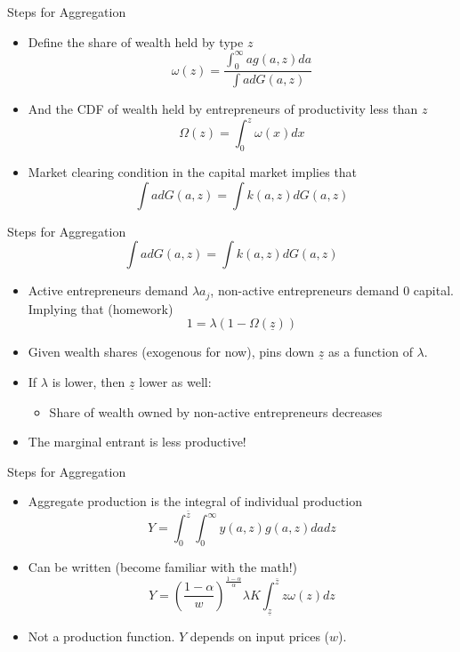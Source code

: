 \documentclass[11pt,aspectratio=169,xcolor={dvipsnames},hyperref={pdftex,pdfpagemode=UseNone,hidelinks,pdfdisplaydoctitle=true},usepdftitle=false]{beamer}
\begin{document}
\begin{frame}{Steps for Aggregation}
\begin{itemize}
\item Define the share of wealth held by type $z$
\[\omega(z) = \frac{ \int_0^{\infty} a g(a,z) da}{\int a dG(a,z)}\]
\item And the CDF of wealth held by entrepreneurs of productivity less than $z$
\[\Omega(z) = \int_0^z \omega(x) dx\]
\item Market clearing condition in the capital market implies that
\[\int a dG(a,z) = \int k(a,z) dG(a,z)\]
\end{itemize}
\end{frame}

\begin{frame}{Steps for Aggregation}
\[\int a dG(a,z) = \int k(a,z) dG(a,z)\]
\begin{itemize}
\item Active entrepreneurs demand $\lambda a_j$, non-active entrepreneurs demand 0 capital. Implying that (homework)
\[1 = \lambda( 1 - \Omega(\underline{z}))\]
\item Given wealth shares (exogenous for now), pins down $\underline{z}$ as a function of $\lambda$.
\item If $\lambda$ is lower, then $\underline{z}$ lower as well:
\begin{itemize}
\item Share of wealth owned by non-active entrepreneurs decreases
\end{itemize}
\item The marginal entrant is less productive!
\end{itemize}
\end{frame}



\begin{frame}{Steps for Aggregation}
\begin{itemize}
\item Aggregate production is the integral of individual production
\[Y = \int_0^{\bar{z}} \int_0^{\infty} y(a,z) g(a,z) da dz\]
\item Can be written (become familiar with the math!)
\[Y = \left(\frac{1-\alpha}{w}\right)^{\frac{1-\alpha}{\alpha}} \lambda K \int_{\underline{z}}^{\bar{z}} z \omega(z) dz \]
\item Not a production function. $Y$ depends on input prices ($w$).
\end{itemize}
\end{frame}
\end{document}
